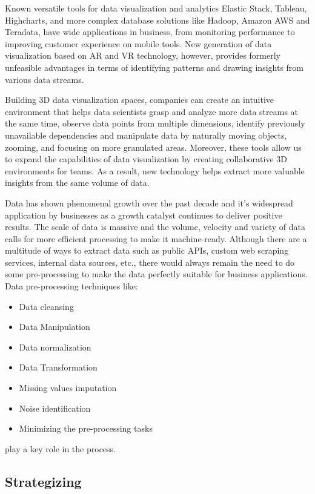 \documentclass[]{book}
\providecommand{\tightlist}{%
  \setlength{\itemsep}{0pt}\setlength{\parskip}{0pt}}
\theoremstyle{definition}
\theoremstyle{definition}
\theoremstyle{definition}
\theoremstyle{remark}
\begin{document}
Known versatile tools for data visualization and analytics Elastic
Stack, Tableau, Highcharts, and more complex database solutions like
Hadoop, Amazon AWS and Teradata, have wide applications in business,
from monitoring performance to improving customer experience on mobile
tools. New generation of data visualization based on AR and VR
technology, however, provides formerly unfeasible advantages in terms of
identifying patterns and drawing insights from various data streams.

Building 3D data visualization spaces, companies can create an intuitive
environment that helps data scientists grasp and analyze more data
streams at the same time, observe data points from multiple dimensions,
identify previously unavailable dependencies and manipulate data by
naturally moving objects, zooming, and focusing on more granulated
areas. Moreover, these tools allow us to expand the capabilities of data
visualization by creating collaborative 3D environments for teams. As a
result, new technology helps extract more valuable insights from the
same volume of data.

Data has shown phenomenal growth over the past decade and it's
widespread application by businesses as a growth catalyst continues to
deliver positive results. The scale of data is massive and the volume,
velocity and variety of data calls for more efficient processing to make
it machine-ready. Although there are a multitude of ways to extract data
such as public APIs, custom web scraping services, internal data
sources, etc., there would always remain the need to do some
pre-processing to make the data perfectly suitable for business
applications. Data pre-processing techniques like:

\begin{itemize}
\tightlist
\item
  Data cleansing
\item
  Data Manipulation
\item
  Data normalization
\item
  Data Transformation
\item
  Missing values imputation
\item
  Noise identification
\item
  Minimizing the pre-processing tasks
\end{itemize}

play a key role in the process.

\subsection{Strategizing}\label{strategizing}
\end{document}
